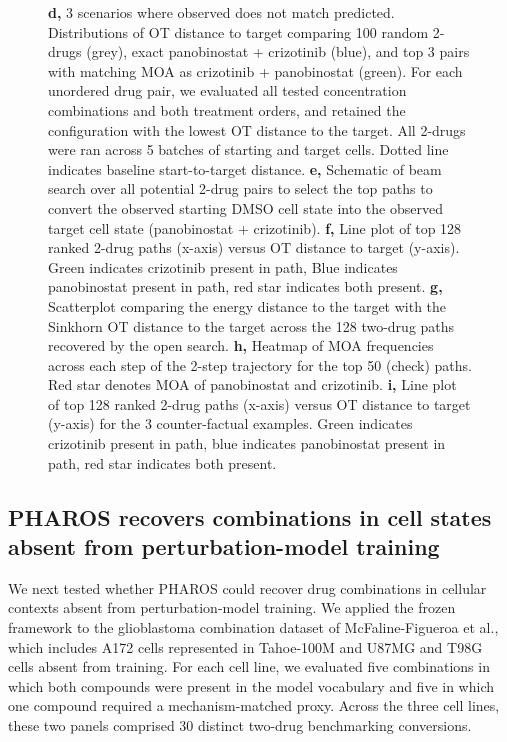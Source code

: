 \documentclass[11pt,a4paper]{article}
\begin{document}
\begin{figure}[!t]
\ContinuedFloat
\captionsetup{
    list=off,
    labelformat=figcontinued,
    labelsep=colon
}

\vspace*{-\baselineskip} %
\mbox{} %

\caption[]{
\textbf{d,} 3 scenarios where observed does not match predicted. Distributions of OT distance to target comparing 100 random 2-drugs (grey), exact panobinostat + crizotinib (blue), and top 3 pairs with matching MOA as crizotinib + panobinostat (green). For each unordered drug pair, we evaluated all tested concentration combinations and both treatment orders, and retained the configuration with the lowest OT distance to the target. All 2-drugs were ran across 5 batches of starting and target cells. Dotted line indicates baseline start-to-target distance. 
\textbf{e,} Schematic of beam search over all potential 2-drug pairs to select the top paths to convert the observed starting DMSO cell state into the observed target cell state (panobinostat + crizotinib).
\textbf{f,} Line plot of top 128 ranked 2-drug paths (x-axis) versus OT distance to target (y-axis). Green indicates crizotinib present in path, Blue indicates panobinostat present in path, red star indicates both present.
\textbf{g,} Scatterplot comparing the energy distance to the target with the Sinkhorn OT distance to the target across the 128 two-drug paths recovered by the open search.
\textbf{h,} Heatmap of MOA frequencies across each step of the 2-step trajectory for the top 50 (check) paths. Red star denotes MOA of panobinostat and crizotinib.
\textbf{i,} Line plot of top 128 ranked 2-drug paths (x-axis) versus OT distance to target (y-axis) for the 3 counter-factual examples. Green indicates crizotinib present in path, blue indicates panobinostat present in path, red star indicates both present.
}
\end{figure}


\subsection{PHAROS recovers combinations in cell states absent from perturbation-model training}\label{subsec5}

We next tested whether PHAROS could recover drug combinations in cellular contexts absent from perturbation-model training. We applied the frozen framework to the glioblastoma combination dataset of McFaline-Figueroa et al.\cite{McFaline-Figueroa2024}, which includes A172 cells represented in Tahoe-100M and U87MG and T98G cells absent from training. For each cell line, we evaluated five combinations in which both compounds were present in the model vocabulary and five in which one compound required a mechanism-matched proxy. Across the three cell lines, these two panels comprised 30 distinct two-drug benchmarking conversions.
\end{document}
